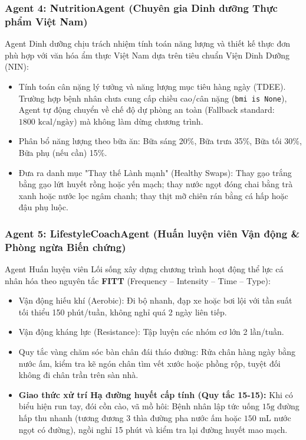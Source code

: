\documentclass[12pt,a4paper]{article}
\begin{document}
\subsubsection{Agent 4: NutritionAgent (Chuyên gia Dinh dưỡng Thực phẩm Việt Nam)}
Agent Dinh dưỡng chịu trách nhiệm tính toán năng lượng và thiết kế thực đơn phù hợp với văn hóa ẩm thực Việt Nam dựa trên tiêu chuẩn Viện Dinh Dưỡng (NIN):
\begin{itemize}[leftmargin=1.2cm]
    \item Tính toán cân nặng lý tưởng và năng lượng mục tiêu hàng ngày (TDEE). Trường hợp bệnh nhân chưa cung cấp chiều cao/cân nặng (\texttt{bmi is None}), Agent tự động chuyển về chế độ dự phòng an toàn (Fallback standard: $1800\text{ kcal/ngày}$) mà không làm dừng chương trình.
    \item Phân bổ năng lượng theo bữa ăn: Bữa sáng 20\%, Bữa trưa 35\%, Bữa tối 30\%, Bữa phụ (nếu cần) 15\%.
    \item Đưa ra danh mục "Thay thế Lành mạnh" (Healthy Swaps): Thay gạo trắng bằng gạo lứt huyết rồng hoặc yến mạch; thay nước ngọt đóng chai bằng trà xanh hoặc nước lọc ngâm chanh; thay thịt mỡ chiên rán bằng cá hấp hoặc đậu phụ luộc.
\end{itemize}

\subsubsection{Agent 5: LifestyleCoachAgent (Huấn luyện viên Vận động \& Phòng ngừa Biến chứng)}
Agent Huấn luyện viên Lối sống xây dựng chương trình hoạt động thể lực cá nhân hóa theo nguyên tắc \textbf{FITT} (Frequency -- Intensity -- Time -- Type):
\begin{itemize}[leftmargin=1.2cm]
    \item Vận động hiếu khí (Aerobic): Đi bộ nhanh, đạp xe hoặc bơi lội với tần suất tối thiểu 150 phút/tuần, không nghỉ quá 2 ngày liên tiếp.
    \item Vận động kháng lực (Resistance): Tập luyện các nhóm cơ lớn 2 lần/tuần.
    \item Quy tắc vàng chăm sóc bàn chân đái tháo đường: Rửa chân hàng ngày bằng nước ấm, kiểm tra kẽ ngón chân tìm vết xước hoặc phồng rộp, tuyệt đối không đi chân trần trên sàn nhà.
    \item \textbf{Giao thức xử trí Hạ đường huyết cấp tính (Quy tắc 15-15):} Khi có biểu hiện run tay, đói cồn cào, vã mồ hôi: Bệnh nhân lập tức uống $15\text{g}$ đường hấp thu nhanh (tương đương 3 thìa đường pha nước ấm hoặc $150\text{ mL}$ nước ngọt có đường), ngồi nghỉ 15 phút và kiểm tra lại đường huyết mao mạch.
\end{itemize}
\end{document}
